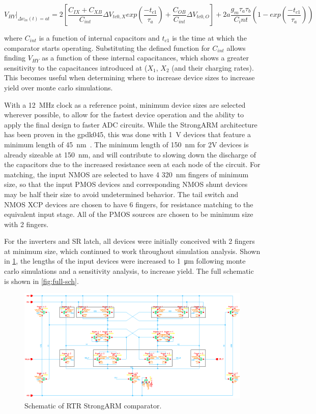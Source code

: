 \documentclass[11pt,letterpaper]{article}
\begin{document}
\begin{equation}
    V_{HY}\bigg\rvert_{\Delta v_{in}(t) = at} = 2\left[\dfrac{C_{IX} + C_{XB}}{C_{int}}\Delta V_{tc0,X} exp\left(\dfrac{-t_{c1}}{\tau_{a}}\right) + \dfrac{C_{OB}}{C_{int}}\Delta V_{tc0,O} \right] + 2a\dfrac{g_m \tau_a \tau_b}{C_int} \left(1 - exp\left(\dfrac{-t_{c1}}{\tau_a}\right)\right)
    \label{eq:2}
\end{equation}

where \(C_{int}\) is a function of internal capacitors and \(t_{c1}\) is the time at which the comparator starts operating. Substituting the defined function for \(C_{int}\) allows finding \(V_{HY}\) as a function of these internal capacitances, which shows a greater sensitivity to the capacitances introduced at (\(X_1\), \(X_2\) (and their charging rates). This becomes useful when determining where to increase device sizes to increase yield over monte carlo simulations.


With a \qty{12}{\MHz} clock as a reference point, minimum device sizes are selected wherever possible, to allow for the fastest device operation and the ability to apply the final design to faster ADC circuits. While the StrongARM architecture has been proven in the gpdk045, this was done with \qty{1}{\V} devices that feature a minimum length of \qty{45}{\nm}~\cite{Dutta}. The minimum length of \qty{150}{\nm} for 2V devices is already sizeable at \qty{150}{\nm}, and will contribute to slowing down the discharge of the capacitors due to the increased resistance seen at each node of the circuit. For matching, the input NMOS are selected to have 4 \qty{320}{\nm} fingers of minimum size, so that the input PMOS devices and corresponding NMOS shunt devices may be half their size to avoid undetermined behavior. The tail switch and NMOS XCP devices are chosen to have 6 fingers, for resistance matching to the equivalent input stage. All of the PMOS sources are chosen to be minimum size with 2 fingers.


For the inverters and SR latch, all devices were initially conceived with 2 fingers at minimum size, which continued to work throughout simulation analysis. Shown in \cref{fig:comp-sch}, the lengths of the input devices were increased to \qty{1}{\um} following monte carlo simulations and a sensitivity analysis, to increase yield. The full schematic is shown in \cref{fig:full-sch}.

\begin{figure}[htbp]
    \centering
    \includegraphics[width=\textwidth]{images/sch_comp.eps}
    \caption{Schematic of RTR StrongARM comparator.}
    \label{fig:comp-sch}
\end{figure}
\end{document}
